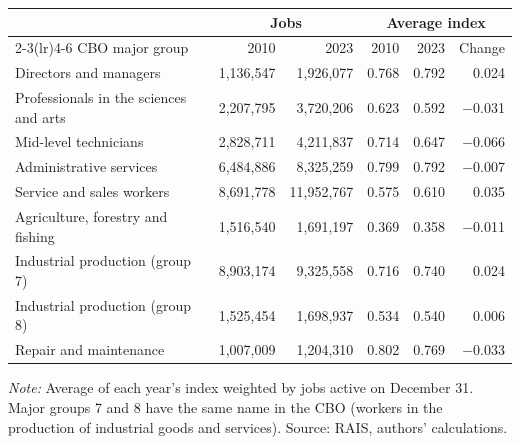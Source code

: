 {\small
\begin{threeparttable}
\begin{tabular}{lrrrrr}
\toprule
 & \multicolumn{2}{c}{Jobs} & \multicolumn{3}{c}{Average index} \\
\cmidrule(lr){2-3}\cmidrule(lr){4-6}
CBO major group & 2010 & 2023 & 2010 & 2023 & Change \\
\midrule
Directors and managers & 1,136,547 & 1,926,077 & 0.768 & 0.792 & 0.024 \\
Professionals in the sciences and arts & 2,207,795 & 3,720,206 & 0.623 & 0.592 & $-$0.031 \\
Mid-level technicians & 2,828,711 & 4,211,837 & 0.714 & 0.647 & $-$0.066 \\
Administrative services & 6,484,886 & 8,325,259 & 0.799 & 0.792 & $-$0.007 \\
Service and sales workers & 8,691,778 & 11,952,767 & 0.575 & 0.610 & 0.035 \\
Agriculture, forestry and fishing & 1,516,540 & 1,691,197 & 0.369 & 0.358 & $-$0.011 \\
Industrial production (group 7) & 8,903,174 & 9,325,558 & 0.716 & 0.740 & 0.024 \\
Industrial production (group 8) & 1,525,454 & 1,698,937 & 0.534 & 0.540 & 0.006 \\
Repair and maintenance & 1,007,009 & 1,204,310 & 0.802 & 0.769 & $-$0.033 \\
\bottomrule
\end{tabular}
\begin{tablenotes}[flushleft]\footnotesize
\item \textit{Note:} Average of each year's index weighted by jobs active on December 31. Major groups 7 and 8 have the same name in the CBO (workers in the production of industrial goods and services). Source: RAIS, authors' calculations.
\end{tablenotes}
\end{threeparttable}
}
